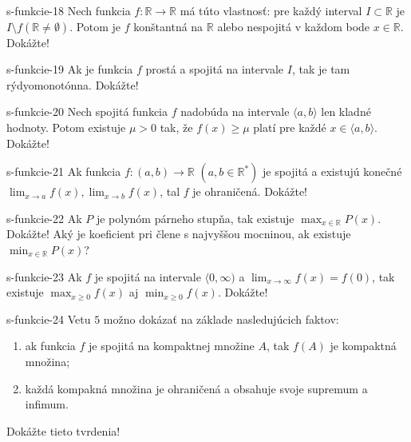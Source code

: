   \begin{defproblem}{s-funkcie-18}
  Nech funkcia $f: \mathbb{R} \rightarrow \mathbb{R}$ má túto vlastnosť: pre každý interval $I \subset \mathbb{R}$ je $I \setminus f(\mathbb{R} \neq \emptyset)$. Potom je $f$ konštantná na $\mathbb{R}$ alebo nespojitá v každom bode $x \in \mathbb{R}$. Dokážte!
  \end{defproblem}

  \begin{defproblem}{s-funkcie-19}
  Ak je funkcia $f$ prostá a spojitá na intervale $I$, tak je tam rýdyomonotónna. Dokážte!
  \end{defproblem}

  \begin{defproblem}{s-funkcie-20}
  Nech spojitá funkcia $f$ nadobúda na intervale $\langle a,b \rangle$ len kladné hodnoty. Potom existuje $\mu > 0$ tak, že $f(x) \geq \mu$ platí pre každé $x \in \langle a,b \rangle$. Dokážte!
  \end{defproblem}

  \begin{defproblem}{s-funkcie-21}
  Ak funkcia $f: (a,b) \rightarrow \mathbb{R}$ $(a,b\in \mathbb{R^*})$ je spojitá a existujú konečné $\lim_{x \rightarrow a}f(x),\lim_{x \rightarrow b}f(x)$, tal $f$ je ohraničená. Dokážte!
  \end{defproblem}

  \begin{defproblem}{s-funkcie-22}
  Ak $P$ je polynóm párneho stupňa, tak existuje $\max_{x \in \mathbb{R}} P(x)$. Dokážte! Aký je koeficient pri člene s najvyššou mocninou, ak existuje $\min_{x \in \mathbb{R}} P(x)$?
  \end{defproblem}

  \begin{defproblem}{s-funkcie-23}
  Ak $f$ je spojitá na intervale $\langle0,\infty)$ a $\lim_{x \rightarrow \infty} f(x)=f(0)$, tak existuje $\max_{x \geq 0} f(x)$ aj $\min_{x \geq 0}f(x)$. Dokážte!
  \end{defproblem}

  \begin{defproblem}{s-funkcie-24}
  Vetu $5$ možno dokázať na základe nasledujúcich faktov:
  \begin{enumerate}
  \item ak funkcia $f$ je spojitá na kompaktnej množine $A$, tak $f(A)$ je kompaktná množina;
  \item každá kompakná množina je ohraničená a obsahuje svoje supremum a infimum.
  \end{enumerate}
  Dokážte tieto tvrdenia!
  \end{defproblem}

